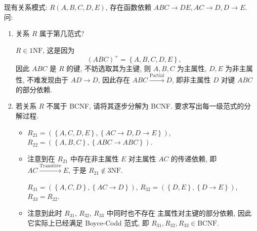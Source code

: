\documentclass[10pt,UTF8]{book} %
\begin{document}
\begin{example}
    现有关系模式: $R(A, B, C, D, E)$, 存在函数依赖 
    $A B C \rightarrow D E, A C \rightarrow D, D \rightarrow E$.
    问:
    \begin{enumerate}[label={$\left.\arabic*\right)$}, itemsep=0pt]
        \item 关系 $R$ 属于第几范式?
        \begin{sol}
            $R \in \mathrm{1NF}$, 这是因为
            \[ (ABC)^+ = \left\{ A,B,C,D,E \right\}, \]
            因此 $ABC$ 是 $R$ 的键, 不妨选取其为主键,
            则 $A,B,C$ 为主属性, $D, E$ 为非主属性,
            不难发现由于 $AD \to D$,
            因此存在 $ABC \xrightarrow{\mathrm{Partial}} D$,
            即非主属性 $D$ 对键 $ABC$ 的部分依赖.
        \end{sol}
        \item 若关系 $R$ 不属于 BCNF, 请将其逐步分解为 BCNF.
        要求写出每一级范式的分解过程.
        \begin{itemize}[itemsep=0pt]
            \item $R_{21} = (\left\{A,C,D,E\right\}, \left\{
                AC \to D, D \to E
            \right\})$, $R_{22} = (\left\{ A,B,C \right\},
            \left\{
                ABC \to ABC
            \right\})$.
            \item 注意到在 $R_{21}$ 中存在非主属性 $E$ 对主属性 $AC$
            的传递依赖, 即 $AC \xrightarrow{\mathrm{Transitive}} E$,
            于是 $R_{21} \notin \mathrm{3NF}$.

            $R_{31} = \left(
                \left\{
                    A, C, D
                \right\}, \left\{
                    AC \to D
                \right\}
            \right)$, $R_{32} = \left(
                \left\{ D,E \right\}, \left\{
                    D \to E
                \right\}
            \right)$, $R_{33} = R_{22}$.
            \item 注意到此时 $R_{31}$, $R_{32}$, $R_{33}$ 中同时也不存在
            主属性对主键的部分依赖, 因此它实际上已经满足 Boyce-Codd 范式,
            即 $R_{31}, R_{32}, R_{33} \in \mathrm{BCNF}$.
        \end{itemize}
    \end{enumerate}
\end{example}
\end{document}
